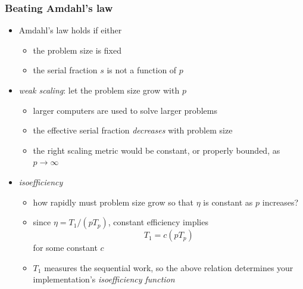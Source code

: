\begin{frame}[fragile]
%
  \frametitle{Beating Amdahl's law}
%
  \begin{itemize}
  \item Amdahl's law holds if either
    \begin{itemize}
      \item the problem size is fixed
      \item the serial fraction $s$ is not a function of $p$
    \end{itemize}
%
  \item {\em weak scaling}: let the problem size grow with $p$
    \begin{itemize}
    \item larger computers are used to solve larger problems
    \item the effective serial fraction {\em decreases} with problem size
    \item the right scaling metric would be constant, or properly bounded, as $p \rightarrow
      \infty$
    \end{itemize}
%
  \item {\em isoefficiency}
    \begin{itemize}
      \item how rapidly must problem size grow so that $\eta$ is constant as $p$ increases?
      \item since $\eta = T_{1}/(pT_{p})$, constant efficiency implies
        \[
        T_{1} = c (p T_{p})
        \]
        for some constant $c$
      \item $T_{1}$ measures the sequential work, so the above relation determines your
        implementation's {\em isoefficiency function}
    \end{itemize}
%
  \end{itemize}
%
\end{frame}



